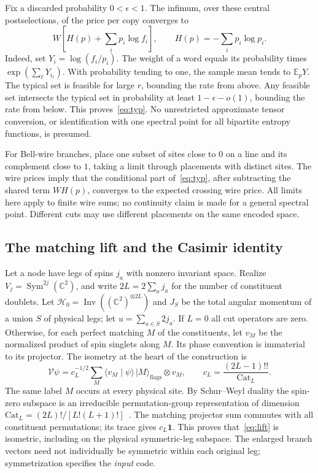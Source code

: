 \documentclass[11pt]{article}
\theoremstyle{remark}
\DeclareMathOperator{\Inv}{Inv}
\DeclareMathOperator{\Sym}{Sym}
\newcommand{\id}{\mathbf{1}}
\newcommand{\HH}{\mathcal H}
\newcommand{\pket}[1]{\lvert #1\rangle}
\newcommand{\braket}[2]{\langle #1 \mid #2 \rangle}
\newcommand{\C}{\mathbb C}
\begin{document}
Fix a discarded probability \(0<\epsilon<1\). The infimum, over these central postselections, of the price per copy converges to
\begin{equation}\label{eq:typ}
 W\left[H(p)+\sum_i p_i\log f_i\right],
 \qquad H(p)=-\sum_i p_i\log p_i.
\end{equation}
Indeed, set \(Y_i=\log(f_i/p_i)\). The weight of a word equals its probability times \(\exp(\sum_\ell Y_{i_\ell})\). With probability tending to one, the sample mean tends to \(\mathbb E_pY\). The typical set is feasible for large \(r\), bounding the rate from above. Any feasible set intersects the typical set in probability at least \(1-\epsilon-o(1)\), bounding the rate from below. This proves~\eqref{eq:typ}. No unrestricted approximate tensor conversion, or identification with one spectral point for all bipartite entropy functions, is presumed.

For Bell-wire branches, place one subset of sites close to \(0\) on a line and its complement close to \(1\), taking a limit through placements with distinct sites. The wire prices imply that the conditional part of~\eqref{eq:typ}, after subtracting the shared term \(WH(p)\), converges to the expected crossing wire price. All limits here apply to finite wire sums; no continuity claim is made for a general spectral point. Different cuts may use different placements on the same encoded space.

\subsection{The matching lift and the Casimir identity}

Let a node have legs of spins \(j_a\) with nonzero invariant space. Realize \(V_j=\Sym^{2j}(\C^2)\), and write \(2L=2\sum_a j_a\) for the number of constituent doublets. Let \(\HH_0=\Inv((\C^2)^{\otimes 2L})\) and \(J_S\) be the total angular momentum of a union \(S\) of physical legs; let \(u=\sum_{a\in S}2j_a\). If \(L=0\) all cut operators are zero. Otherwise, for each perfect matching \(M\) of the constituents, let \(v_M\) be the normalized product of spin singlets along \(M\). Its phase convention is immaterial to its projector. The isometry at the heart of the construction is
\begin{equation}\label{eq:lift}
 \mathcal V\psi=c_L^{-1/2}\sum_M
 \braket{v_M}{\psi}\,\pket{M}_{\mathrm{flags}}\otimes v_M,\qquad
 c_L=\frac{(2L-1)!!}{\mathrm{Cat}_L}.
\end{equation}
The same label \(M\) occurs at every physical site. By Schur--Weyl duality the spin-zero subspace is an irreducible permutation-group representation of dimension \(\mathrm{Cat}_L=(2L)!/[L!(L+1)!]\)~\cite{FH}. The matching projector sum commutes with all constituent permutations; its trace gives \(c_L\id\). This proves that~\eqref{eq:lift} is isometric, including on the physical symmetric-leg subspace. The enlarged branch vectors need not individually be symmetric within each original leg; symmetrization specifies the \emph{input} code.
\end{document}
